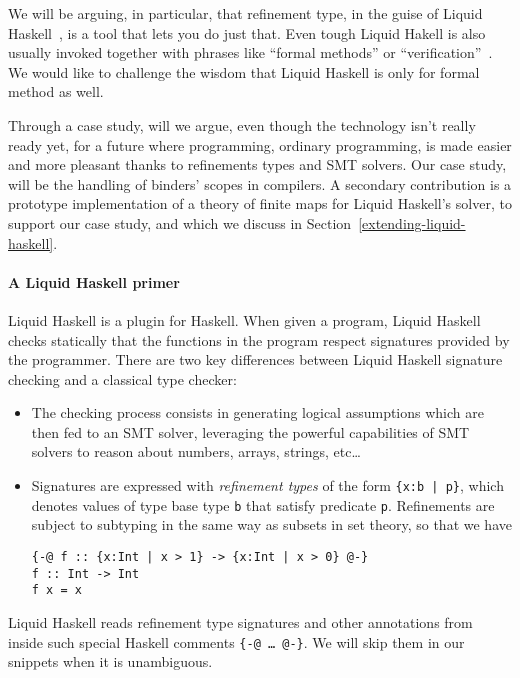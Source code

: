 \documentclass[sigconf, anonymous, review]{acmart}
\newcommand{\tc}[1]{{\small\texttt{#1}}}
\begin{document}
We will be arguing, in particular, that refinement type, in the guise of Liquid
Haskell~\cite{vazou14b}, is a tool that lets you do just that. Even tough Liquid
Hakell is also usually invoked together with phrases like ``formal methods'' or
``verification''~\cite{vazou14,lehmann21,liu20,redmond23}. We would like to
challenge the wisdom that Liquid Haskell is only for formal method as well.

Through a case study, will we argue, even though the technology isn't really
ready yet, for a future where programming, ordinary programming, is made easier
and more pleasant thanks to refinements types and SMT solvers. Our case study,
will be the handling of binders' scopes in compilers. A secondary contribution
is a prototype implementation of a theory of finite maps for Liquid Haskell's
solver, to support our case study, and which we discuss in
Section~\ref{extending-liquid-haskell}.

\paragraph{A Liquid Haskell primer}
Liquid Haskell is a
plugin for Haskell. When given a program, Liquid Haskell
checks statically that the functions in the program respect signatures
provided by the programmer. There are two key differences between Liquid Haskell
signature checking and a classical type checker:

\begin{itemize}
  \item The checking process consists in generating logical assumptions which
        are then fed to an SMT solver, leveraging the powerful
        capabilities of SMT solvers to reason about numbers, arrays, strings, etc…
  \item Signatures are expressed with \emph{refinement types} of the form
        \tc{\{x:b | p\}}, which denotes values of type
        base type \tc{b} that satisfy predicate \tc{p}.
        Refinements are subject to subtyping in the same way as subsets in set
        theory, so that we have
\begin{verbatim}
{-@ f :: {x:Int | x > 1} -> {x:Int | x > 0} @-}
f :: Int -> Int
f x = x
\end{verbatim}
\end{itemize}

Liquid Haskell reads refinement type signatures and other annotations from
inside such special Haskell comments
\tc{\{-@ \ldots\ @-\}}. We will skip them in our snippets when it is unambiguous.
\end{document}
